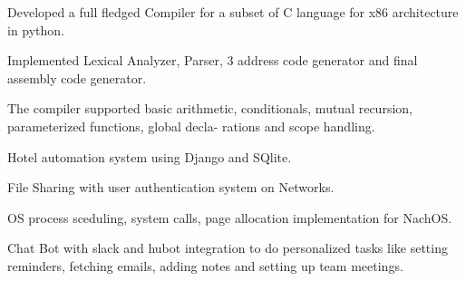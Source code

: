 \documentclass[]{deedy-resume-openfont}
\begin{document}
\begin{minipage}[t]{0.69\textwidth}

\begin{tightemize}
\item Developed a full fledged Compiler for a subset of C language for x86 architecture in python.
\item Implemented Lexical Analyzer, Parser, 3 address code generator and final assembly code generator.
\item The compiler supported basic arithmetic, conditionals, mutual recursion, parameterized functions, global decla-
rations and scope handling.
\end{tightemize}




\begin{tightemize}
\item Hotel automation system using Django and SQlite.
\item File Sharing with user authentication system on Networks.
\item OS process sceduling, system calls, page allocation implementation for NachOS.
\item Chat Bot with slack and hubot integration to do personalized tasks like setting reminders, fetching emails, adding notes and setting up team meetings.
\end{tightemize}


\end{minipage}
\end{document}
